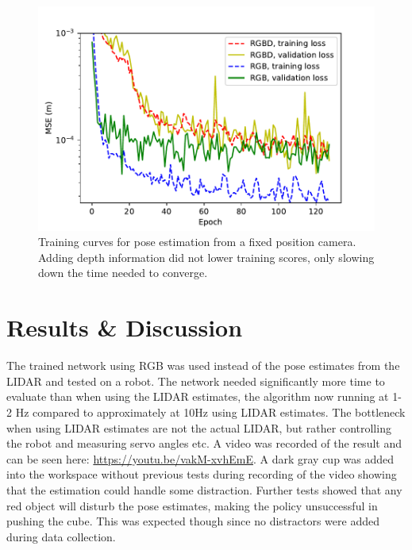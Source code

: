 \begin{figure}[h!]
    \centering
    \includegraphics[width=0.6 \textwidth]{res/depth-vs-rgb.pdf}

    \caption{Training curves for pose estimation from a fixed position camera.
    Adding depth information did not lower training scores, only slowing down
    the time needed to converge.}

    \label{fig:depth-vs-rgb}
    
\end{figure}

\section{Results \& Discussion}

The trained network using RGB was used instead of the pose estimates from the
LIDAR and tested on a robot. The network needed significantly more time to
evaluate than when using the LIDAR estimates, the algorithm now running at 1-2
Hz compared to approximately at 10Hz using LIDAR estimates. The bottleneck when
using LIDAR estimates are not the actual LIDAR, but rather controlling the
robot and measuring servo angles etc. A video was recorded of the result and
can be seen here: \url{https://youtu.be/vakM-xvhEmE}. A dark gray cup was added
into the workspace without previous tests during recording of the video showing
that the estimation could handle some distraction. Further tests showed that
any red object will disturb the pose estimates, making the policy unsuccessful
in pushing the cube. This was expected though since no distractors were added
during data collection.
